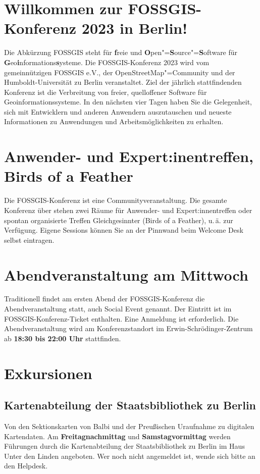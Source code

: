 \newpage
\section*{Willkommen zur FOSSGIS-Konferenz 2023 in Berlin!}\label{welcome}
Die Abkürzung { FOSSGIS} steht für {\bfseries f}reie und {\bfseries O}pen"={\bfseries S}ource"={\bfseries S}oftware für {\bfseries G}eo{\bfseries i}nformations{\bfseries s}ysteme.
Die FOSSGIS-Konferenz 2023 wird vom gemeinnützigen FOSSGIS e.V., der
OpenStreetMap"=Community und der Humboldt-Universität zu Berlin
veranstaltet.
Ziel der jährlich stattfindenden Konferenz ist die Verbreitung von freier,
quelloffener Software für Geoinformationssysteme. In den nächsten vier Tagen
haben Sie die Gelegenheit, sich mit Entwicklern und anderen Anwendern
auszutauschen und \mbox{neueste} Informationen zu Anwendungen und
Arbeitsmöglichkeiten zu erhalten.

\section*{Anwender- und Expert:inentreffen, Birds of a Feather}
Die FOSSGIS-Konferenz ist eine Communityveranstaltung.
Die gesamte Konferenz über stehen zwei Räume für Anwender- und Expert:innentreffen oder spontan organisierte
Treffen Gleichgesinnter (Birds of a Feather), u.\,ä.
zur Verfügung. Eigene Sessions können Sie an der Pinnwand beim
Welcome Desk selbst eintragen.

\section*{Abendveranstaltung am Mittwoch}\label{schwaetzli}
Traditionell findet am ersten Abend der FOSSGIS-Konferenz die
Abendveranstaltung statt, auch Social Event genannt. Der Eintritt
ist im FOSSGIS-Konferenz-Ticket enthalten. Eine Anmeldung ist erforderlich.
Die Abendveranstaltung wird am Konferenzstandort im Erwin-Schrödinger-Zentrum
ab {\bfseries 18:30 bis 22:00 Uhr} stattfinden.

\section*{Exkursionen}
\subsection*{Kartenabteilung der Staatsbibliothek zu Berlin}
Von den Sektionskarten von Balbi und der Preußischen Uraufnahme zu digitalen Kartendaten.
Am {\bfseries Freitagnachmittag} und {\bfseries Samstagvormittag} werden Führungen durch die Karten\-abteilung der Staatsbibliothek zu Berlin im Haus Unter den Linden angeboten. Wer noch nicht angemeldet ist, wende sich bitte an den Helpdesk.
\pagebreak

